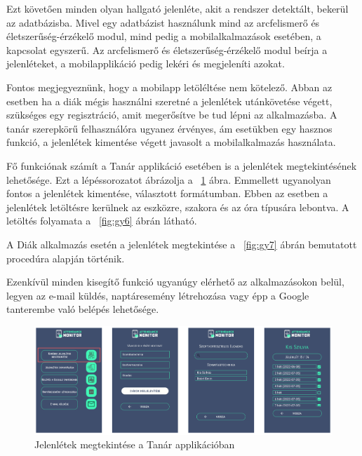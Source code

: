 \newpage


Ezt követően minden olyan hallgató jelenléte, akit a rendszer detektált, bekerül az adatbázisba. Mivel egy adatbázist használunk mind az arcfelismerő és életszerűség-érzékelő modul, mind pedig a mobilalkalmazások esetében, a kapcsolat egyszerű. Az arcfelismerő és életszerűség-érzékelő modul beírja a jelenléteket, a mobilapplikáció pedig lekéri és megjeleníti azokat.

Fontos megjegyeznünk, hogy a mobilapp letöléltése nem kötelező. Abban az esetben ha a diák mégis használni szeretné a jelenlétek utánkövetése végett, szükséges egy regisztráció, amit megerősítve be tud lépni az alkalmazásba. A tanár szerepkörű felhasználóra ugyanez érvényes, ám esetükben egy hasznos funkció, a jelenlétek kimentése végett javasolt a mobilalkalmazás használata. 

Fő funkciónak számít a Tanár applikáció esetében is a jelenlétek megtekintésének lehetősége. Ezt a lépéssorozatot ábrázolja a ~\ref{fig:gy5} ábra. Emmellett ugyanolyan fontos a jelenlétek kimentése, választott formátumban. Ebben az esetben a jelenlétek letöltésre kerülnek az eszközre, szakora és az óra típusára lebontva. A letöltés folyamata a ~\ref{fig:gy6} ábrán látható.

A Diák alkalmazás esetén a jelenlétek megtekintése a ~\ref{fig:gy7} ábrán bemutatott procedúra alapján történik.

Ezenkívül minden kisegítő funkció ugyanúgy elérhető az alkalmazásokon belül, legyen az e-mail küldés, naptáresemény létrehozása vagy épp a Google tanterembe való belépés lehetősége.



\begin{figure}[htbp]
	\includegraphics[width=\textwidth]{figures/gy5.png}
	\caption{Jelenlétek megtekintése a Tanár applikációban}
	\label{fig:gy5}
\end{figure}

